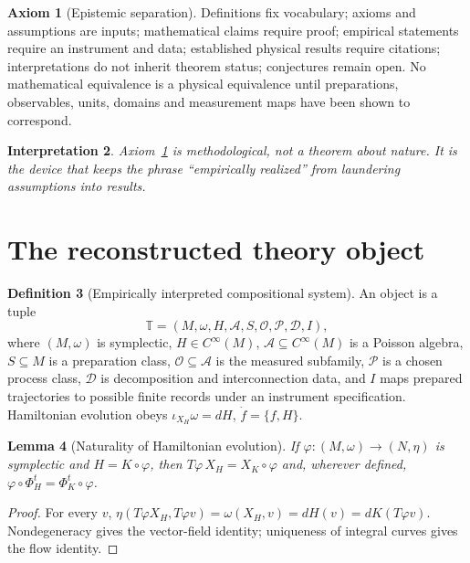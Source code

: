 \documentclass[12pt,a4paper]{article}
\theoremstyle{definition}
\newtheorem{definition}{Definition}[section]
\newtheorem{axiom}[definition]{Axiom}
\theoremstyle{plain}
\newtheorem{lemma}[definition]{Lemma}
\theoremstyle{commentary}
\newtheorem{interpretation}[definition]{Interpretation}
\newcommand{\Cinf}{C^{\infty}}
\newcommand{\Oc}{\mathcal O}
\begin{document}
\begin{axiom}[Epistemic separation]\label{ax:ep}
Definitions fix vocabulary; axioms and assumptions are inputs; mathematical claims require
proof; empirical statements require an instrument and data; established physical results
require citations; interpretations do not inherit theorem status; conjectures remain open.
No mathematical equivalence is a physical equivalence until preparations, observables, units,
domains and measurement maps have been shown to correspond.
\end{axiom}

\begin{interpretation}
Axiom~\ref{ax:ep} is methodological, not a theorem about nature.  It is the device that keeps
the phrase ``empirically realized'' from laundering assumptions into results.
\end{interpretation}

\section{The reconstructed theory object}

\begin{definition}[Empirically interpreted compositional system]\label{def:ecs}
An object is a tuple
\[
 \mathbb T=(M,\omega,H,\mathcal A,S,\Oc,\mathcal P,\mathcal D,I),
\]
where $(M,\omega)$ is symplectic, $H\in\Cinf(M)$, $\mathcal A\subseteq\Cinf(M)$ is a
Poisson algebra, $S\subseteq M$ is a preparation class, $\Oc\subseteq\mathcal A$ is the
measured subfamily, $\mathcal P$ is a chosen process class, $\mathcal D$ is decomposition and
interconnection data, and $I$ maps prepared trajectories to possible finite records under an
instrument specification.  Hamiltonian evolution obeys
\(\iota_{X_H}\omega=dH\), \(\dot f=\{f,H\}\).
\end{definition}

\begin{lemma}[Naturality of Hamiltonian evolution]\label{lem:nat}
If $\varphi:(M,\omega)\to(N,\eta)$ is symplectic and $H=K\circ\varphi$, then
$T\varphi\,X_H=X_K\circ\varphi$ and, wherever defined,
$\varphi\circ\Phi_H^t=\Phi_K^t\circ\varphi$.
\end{lemma}
\begin{proof}
For every $v$, $\eta(T\varphi X_H,T\varphi v)=\omega(X_H,v)=dH(v)
=dK(T\varphi v)$.  Nondegeneracy gives the vector-field identity; uniqueness of integral
curves gives the flow identity.
\end{proof}
\end{document}
